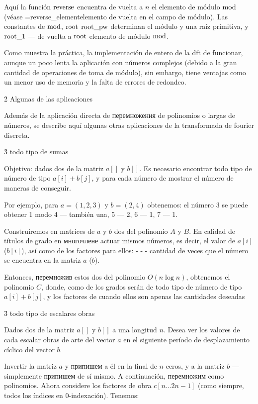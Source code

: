 Aquí la función $\rm reverse$ encuentra de vuelta a $n$ el elemento de módulo $\rm mod$ (véase \algohref=reverse_element{elemento de vuelta en el campo de módulo}). Las constantes de $\rm mod$, $\rm root$ $\rm root\_pw$ determinan el módulo y una raíz primitiva, y $\rm root\_1$ --- de vuelta a $\rm root$ elemento de módulo $\rm mod$.

Como muestra la práctica, la implementación de entero de la dft de funcionar, aunque un poco lenta la aplicación con números complejos (debido a la gran cantidad de operaciones de toma de módulo), sin embargo, tiene ventajas como un menor uso de memoria y la falta de errores de redondeo.


\h2{ Algunas de las aplicaciones }

Además de la aplicación directa de перемножения de polinomios o largas de números, se describe aquí algunas otras aplicaciones de la transformada de fourier discreta.


\h3{ todo tipo de sumas }

Objetivo: dados dos de la matriz $a[]$ y $b[]$. Es necesario encontrar todo tipo de número de tipo $a[i]+b[j]$, y para cada número de mostrar el número de maneras de conseguir.

Por ejemplo, para $a = (1,2,3)$ y $b = (2,4)$ obtenemos: el número 3 se puede obtener 1 modo 4 --- también una, 5 --- 2, 6 --- 1, 7 --- 1.

Construiremos en matrices de $a$ y $b$ dos del polinomio $A$ y $B$. En calidad de títulos de grado en многочлене actuar mismos números, es decir, el valor de $a[i]$ ($b[i]$), así como de los factores para ellos: - - - cantidad de veces que el número se encuentra en la matriz $a$ ($b$).

Entonces, перемножив estos dos del polinomio $O(n \log n)$, obtenemos el polinomio $C$, donde, como de los grados serán de todo tipo de número de tipo $a[i]+b[j]$, y los factores de cuando ellos son apenas las cantidades deseadas


\h3{ todo tipo de escalares obras }

Dados dos de la matriz $a[]$ y $b[]$ a una longitud $n$. Desea ver los valores de cada escalar obras de arte del vector $a$ en el siguiente período de desplazamiento cíclico del vector $b$.

Invertir la matriz $a$ y припишем a él en la final de $n$ ceros, y a la matriz $b$ --- simplemente припишем de sí mismo. A continuación, перемножим como polinomios. Ahora considere los factores de obra $c[n \ldots 2n-1]$ (como siempre, todos los índices en 0-indexación). Tenemos:


